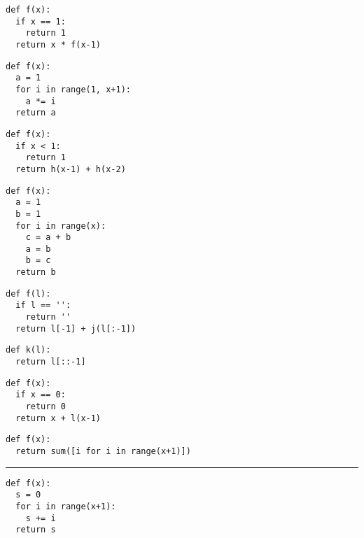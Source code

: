\documentclass[12pt,a4paper]{article}
\begin{document}
\pagestyle{empty}
\noindent

\begin{multicols}{2}

\begin{lstlisting}
def f(x):
  if x == 1:
    return 1
  return x * f(x-1)
\end{lstlisting}

\begin{lstlisting}
def f(x):
  a = 1
  for i in range(1, x+1):
    a *= i
  return a
\end{lstlisting}

\begin{lstlisting}
def f(x):
  if x < 1:
    return 1
  return h(x-1) + h(x-2)
\end{lstlisting}

\begin{lstlisting}
def f(x):
  a = 1
  b = 1
  for i in range(x):
    c = a + b
    a = b
    b = c
  return b
\end{lstlisting}

\begin{lstlisting}
def f(l):
  if l == '':
    return ''
  return l[-1] + j(l[:-1])
\end{lstlisting}

\begin{lstlisting}
def k(l):
  return l[::-1]
\end{lstlisting}

\begin{lstlisting}
def f(x):
  if x == 0:
    return 0
  return x + l(x-1)
\end{lstlisting}

\begin{lstlisting}
def f(x):
  return sum([i for i in range(x+1)])
\end{lstlisting}

\rule{\linewidth}{1pt}

\begin{lstlisting}
def f(x):
  s = 0
  for i in range(x+1):
    s += i
  return s
\end{lstlisting}

\end{multicols}
\end{document}
